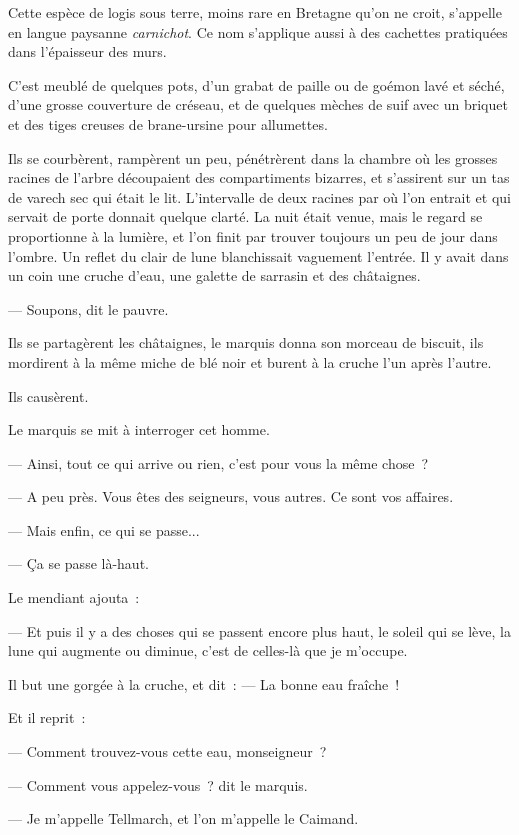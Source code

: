 \documentclass[french,twoside]{book} %
\begin{document}
Cette espèce de logis sous terre, moins rare en Bretagne qu’on ne croit, s’appelle en langue paysanne \emph{carnichot}. Ce nom s’applique aussi à des cachettes pratiquées dans l’épaisseur des murs.\par
C’est meublé de quelques pots, d’un grabat de paille ou de goémon lavé et séché, d’une grosse couverture de créseau, et de quelques mèches de suif avec un briquet et des tiges creuses de brane-ursine pour allumettes.\par
Ils se courbèrent, rampèrent un peu, pénétrèrent dans la chambre où les grosses racines de l’arbre découpaient des compartiments bizarres, et s’assirent sur un tas de varech sec qui était le lit. L’intervalle de deux racines par où l’on entrait et qui servait de porte donnait quelque clarté. La nuit était venue, mais le regard se proportionne à la lumière, et l’on finit par trouver toujours un peu de jour dans l’ombre. Un reflet du clair de lune blanchissait vaguement  l’entrée. Il y avait dans un coin une cruche d’eau, une galette de sarrasin et des châtaignes.\par
— Soupons, dit le pauvre.\par
Ils se partagèrent les châtaignes, le marquis donna son morceau de biscuit, ils mordirent à la même miche de blé noir et burent à la cruche l’un après l’autre.\par
Ils causèrent.\par
Le marquis se mit à interroger cet homme.\par
— Ainsi, tout ce qui arrive ou rien, c’est pour vous la même chose ?\par
— A peu près. Vous êtes des seigneurs, vous autres. Ce sont vos affaires.\par
— Mais enfin, ce qui se passe...\par
— Ça se passe là-haut.\par
Le mendiant ajouta :\par
— Et puis il y a des choses qui se passent encore plus haut, le soleil qui se lève, la lune qui augmente ou diminue, c’est de celles-là que je m’occupe.\par
Il but une gorgée à la cruche, et dit : — La bonne eau fraîche !\par
Et il reprit :\par
— Comment trouvez-vous cette eau, monseigneur ?\par
— Comment vous appelez-vous ? dit le marquis.\par
— Je m’appelle Tellmarch, et l’on m’appelle le Caimand.\par
\end{document}

